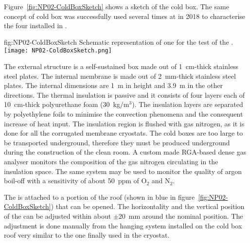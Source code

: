 Figure~\ref{fig:NP02-ColdBoxSketch} shows a sketch of the cold box.
The same concept of cold box was successfully used several times at  in 2018 to characterise the four  installed in .
\begin{dunefigure}{fig:NP02-ColdBoxSketch}
{Schematic representation of one \coldbox for the test of the .}
\texttt{[image: NP02-ColdBoxSketch.png]}
\end{dunefigure}
The external structure is a self-sustained box made out of 1~cm-thick stainless steel plates.
The internal membrane is made out of 2~mm-thick stainless steel plates.
The internal dimensions are 1~m in height and 3.9~m in the other directions.
The thermal insulation is passive and it consists of four layers each of 10~cm-thick polyurethane foam (30~kg/m$^3$).
The insulation layers are separated by polyethylene foils to minimise the convection phenomena and the consequent increase of heat input.
The insulation region is flushed with gas nitrogen, as it is done for all the corrugated membrane cryostats.
The cold boxes are too large to be transported underground, therefore they must be produced underground during the construction of the clean room.
A custom made RGA-based dense gas analyser monitors the composition of the gas nitrogen circulating in the insulation space.
The same system may be used to monitor the quality of argon boil-off with a sensitivity of about 50~ppm of O$_2$ and N$_2$.

The  is attached to a portion of the roof (shown in blue in figure~\ref{fig:NP02-ColdBoxSketch}) that can be opened.
The horizontality and the vertical position of the  can be adjusted within about $\pm 20$~mm around the nominal position.
The adjustment is done manually from the hanging system installed on the cold box roof very similar to the one finally used in the cryostat.

